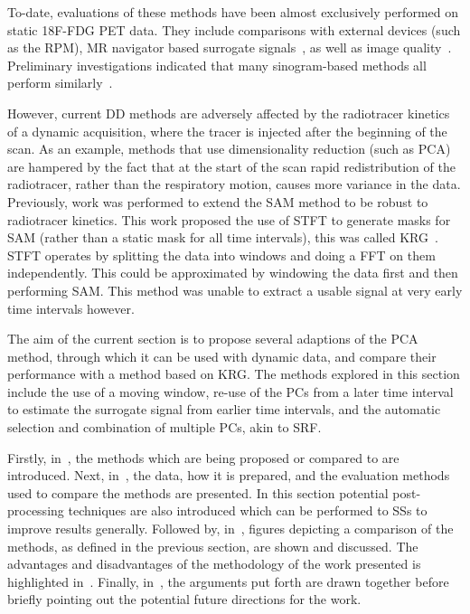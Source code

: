             To-date, evaluations of these methods have been almost exclusively performed on static \gls{18F-FDG} \gls{PET} data. They include comparisons with external devices (such as the \gls{RPM}), \gls{MR} navigator based surrogate signals~\parencite{Manber2015PracticalPET/MR}, as well as image quality~\parencite{Buther2020ClinicalMotion, Walker2019EvaluationImaging}. Preliminary investigations indicated that many sinogram-based methods all perform similarly~\parencite{Thielemans2013ComparisonData}.
            
            However, current \gls{DD} methods are adversely affected by the radiotracer kinetics of a dynamic acquisition, where the tracer is injected after the beginning of the scan. As an example, methods that use dimensionality reduction (such as \gls{PCA}) are hampered by the fact that at the start of the scan rapid redistribution of the radiotracer, rather than the respiratory motion, causes more variance in the data. Previously, work was performed to extend the \gls{SAM} method to be robust to radiotracer kinetics. This work proposed the use of \gls{STFT} to generate masks for \gls{SAM} (rather than a static mask for all time intervals), this was called \gls{KRG}~\parencite{Schleyer2014}. \gls{STFT} operates by splitting the data into windows and doing a \gls{FFT} on them independently. This could be approximated by windowing the data first and then performing \gls{SAM}. This method was unable to extract a usable signal at very early time intervals however.
            
            The aim of the current section is to propose several adaptions of the \gls{PCA} method, through which it can be used with dynamic data, and compare their performance with a method based on \gls{KRG}. The methods explored in this section include the use of a moving window, re-use of the \glspl{PC} from a later time interval to estimate the surrogate signal from earlier time intervals, and the automatic selection and combination of multiple \glspl{PC}, akin to \gls{SRF}.
        
            Firstly, in~, the methods which are being proposed or compared to are introduced. Next, in~, the data, how it is prepared, and the evaluation methods used to compare the methods are presented. In this section potential post-processing techniques are also introduced which can be performed to \glspl{SS} to improve results generally. Followed by, in~, figures depicting a comparison of the methods, as defined in the previous section, are shown and discussed. The advantages and disadvantages of the methodology of the work presented is highlighted in~. Finally, in~, the arguments put forth are drawn together before briefly pointing out the potential future directions for the work.
        
